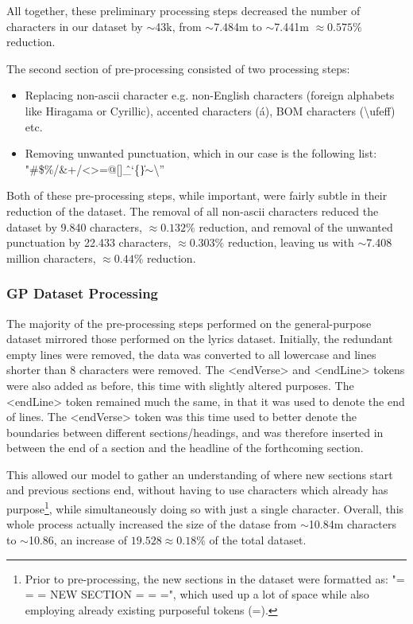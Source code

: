 All together, these preliminary processing steps decreased the number of characters in our dataset by $\sim$43k, from $\sim$7.484m to $\sim$7.441m $\approx0.575\%$ reduction. 

The second section of pre-processing consisted of two processing steps:
\begin{itemize}
    \item Replacing non-ascii character e.g. non-English characters (foreign alphabets like Hiragama or Cyrillic), accented characters (á), BOM characters (\textbackslash{}ufeff) etc.
    \item Removing unwanted punctuation, which in our case is the following list: \\ "\#\$\%\slash\&\(\)\*+/\textless{}\textgreater{}=@[]\^\_`\{\|\}$\sim$\textbackslash{}”
\end{itemize}

Both of these pre-processing steps, while important, were fairly subtle in their reduction of the dataset. The removal of all non-ascii characters reduced the dataset by 9.840 characters, $\approx0.132\%$ reduction, and removal of the unwanted punctuation by 22.433 characters, $\approx0.303\%$ reduction, leaving us with $\sim$7.408 million characters, $\approx0.44\%$ reduction.

\subsubsection{GP Dataset Processing}
\label{general-pre-processing}

The majority of the pre-processing steps performed on the general-purpose dataset mirrored those performed on the lyrics dataset. Initially, the redundant empty lines were removed, the data was converted to all lowercase and lines shorter than 8 characters were removed. The \textless{}endVerse\textgreater{} and \textless{}endLine\textgreater{} tokens were also added as before, this time with slightly altered purposes. The \textless{}endLine\textgreater{} token remained much the same, in that it was used to denote the end of lines. The \textless{}endVerse\textgreater{} token was this time used to better denote the boundaries between different sections/headings, and was therefore inserted in between the end of a section and the headline of the forthcoming section.

This allowed our model to gather an understanding of where new sections start and previous sections end, without having to use characters which already has purpose\footnote{Prior to pre-processing, the new sections in the dataset were formatted as: "= = = NEW SECTION = = =", which used up a lot of space while also employing already existing purposeful tokens (=).}, while simultaneously doing so with just a single character. Overall, this whole process actually increased the size of the datase from $\sim$10.84m characters to $\sim$10.86, an increase of $19.528\approx0.18\%$ of the total dataset.

